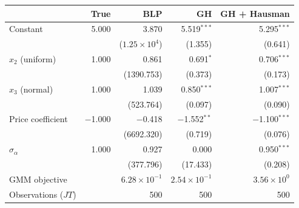 \begin{tabular}{lrrrr}
\toprule
 & True & BLP & GH & GH + Hausman \\
\midrule
Constant & 5.000 & 3.870 & 5.519$^{***}$ & 5.295$^{***}$ \\
 &  & ($1.25\times10^{4}$) & (1.355) & (0.641) \\
$x_2$ (uniform) & 1.000 & 0.861 & 0.691$^{*}$ & 0.706$^{***}$ \\
 &  & (1390.753) & (0.373) & (0.173) \\
$x_3$ (normal) & 1.000 & 1.039 & 0.850$^{***}$ & 1.007$^{***}$ \\
 &  & (523.764) & (0.097) & (0.090) \\
Price coefficient & $-$1.000 & $-$0.418 & $-$1.552$^{**}$ & $-$1.100$^{***}$ \\
 &  & (6692.320) & (0.719) & (0.076) \\
$\sigma_\alpha$ & 1.000 & 0.927 & 0.000 & 0.950$^{***}$ \\
 &  & (377.796) & (17.433) & (0.208) \\
\midrule
GMM objective &  & $6.28\times10^{-1}$ & $2.54\times10^{-1}$ & $3.56\times10^{0}$ \\
Observations ($JT$) &  & 500 & 500 & 500 \\
\bottomrule
\end{tabular}
